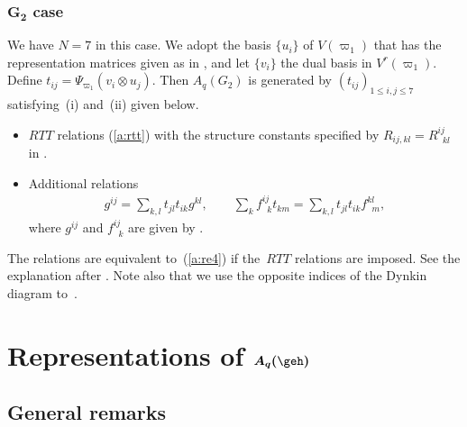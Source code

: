 \subsubsection[$G_2$ case]{$\boldsymbol{G_2}$ case}\label{a:sss:g1}

We have $N=7$ in this case. We adopt the basis $\{u_i\}$ of $V(\varpi_1)$ that has the
representation matrices given as in \cite[equation~(29)]{Sasaki}, and let $\{v_i\}$ the dual basis
in $V^r(\varpi_1)$. Def\/ine $t_{ij}=\Psi_{\varpi_1}(v_i \otimes u_j)$. Then
$A_q(G_2)$ is generated by $(t_{ij})_{1\le i,j \le 7}$ satisfying~(i) and~(ii) given below.
\begin{itemize}\itemsep=0pt
\item[(i)] $RTT$ relations (\ref{a:rtt})
with the structure constants specif\/ied by
$R_{ij,kl} = R^{ij}_{\;\;kl}$ in \cite[equation~(33)]{Sasaki}.
%
\item[(ii)] Additional relations
\begin{gather}\label{a:re4}
g^{ij} = \sum_{k,l}t_{jl}t_{ik}g^{kl},\qquad
\sum_k f^{ij}_{\;\;k} t_{km} = \sum_{k,l}t_{jl}t_{ik} f^{k l}_{\;\;m},
\end{gather}
where $g^{ij}$ and $f^{ij}_{\;\;k}$ are
given by \cite[equations~(30), (31)]{Sasaki}.
\end{itemize}
The relations \cite[equations~(20), (22)]{Sasaki} are
equivalent to~(\ref{a:re4})  if the~$RTT$ relations are imposed.
See the explanation after \cite[Def\/inition~7]{Sasaki}.
Note also that we use the opposite indices of the Dynkin diagram to~\cite{Sasaki}.



\section[Representations of $A_q(\geh)$]{Representations of $\boldsymbol{A_q(\geh)}$}\label{a:sec4}


\subsection{General remarks}\label{a:ss:gr}

